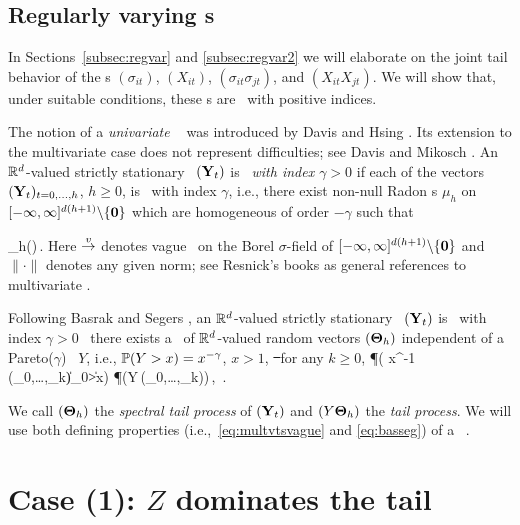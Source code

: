 \subsection{Regularly varying \seq s}\label{subsec:rvts}
In Sections~\ref{subsec:regvar} and \ref{subsec:regvar2} 
we will elaborate on the joint tail behavior of the \seq s
$(\sigma_{it})$, $(X_{it})$, $(\sigma_{it}\sigma_{jt})$, 
and $(X_{it}X_{jt})$. We will show that, under suitable conditions,
these \seq s are \regvary\ with positive indices. 

The notion of a {\em univariate \regvary\ \seq } was introduced by
Davis and Hsing \cite{davis:hsing:1995}. 
Its extension to the multivariate case does not represent
difficulties; see Davis and Mikosch \cite{davis:mikosch:2009b}.
An $\bbr^d$-valued strictly stationary \seq\ $(\bfY_t)$ is {\em
  \regvary\ with index $\gamma>0$} if each of the vectors 
$(\bfY_t)_{t=0,\ldots,h}$, $h\ge 0$, is \regvary\ with index $\gamma$,
i.e., there exist non-null Radon s $\mu_h$ on 
$[-\infty,\infty]^{d(h+1)}\backslash\{\bf0\}$ which are homogeneous of
order $-\gamma$ such that

\beam \label{eq:multvtsvague}
 \stv \mu_h(\cdot)\,.
\eeam
Here $\stv$ denotes vague \con\ on the Borel $\sigma$-field of
$[-\infty,\infty]^{d(h+1)}\backslash\{\bf0\}$ and $\|\cdot\|$ denotes
any given norm; see Resnick's books \cite{resnick:1987,resnick:2007}
as general references to multivariate \regvar.

Following Basrak and Segers \cite{basrak:segers:2009}, 
an $\bbr^d$-valued strictly stationary \seq\ $(\bfY_t)$ is \regvary\
with index $\gamma>0$ \fif\ there exists a \seq\ of $\bbr^d$-valued
random vectors $(\bfTh_h)$ independent of a Pareto($\gamma$) \rv\ 
$Y$, i.e., $\P(Y>x)=x^{-\gamma}$, $x>1$,  \st\ for any $k\ge 0$, 
\beam\label{eq:basseg}
\P( x^{-1} (\bfY_0,\ldots,\bfY_k)\in \cdot \mid \|\bfY_0\|>x)\stw
\P\big(Y\,(\bfTh_0,\ldots,\bfTh_k)\in\cdot\big)\,,\qquad
\xto\,.
\eeam

We call $(\bfTh_h)$ the {\em spectral tail process} of $(\bfY_t)$ and
$(Y \bfTh_h)$ the {\em tail process}. We will use both defining
properties (i.e.,\ \eqref{eq:multvtsvague} and \eqref{eq:basseg}) of a
\regvary\ \seq.


\section{Case (1): $Z$ dominates the tail}\label{sec:case1}\setcounter{equation}{0}

